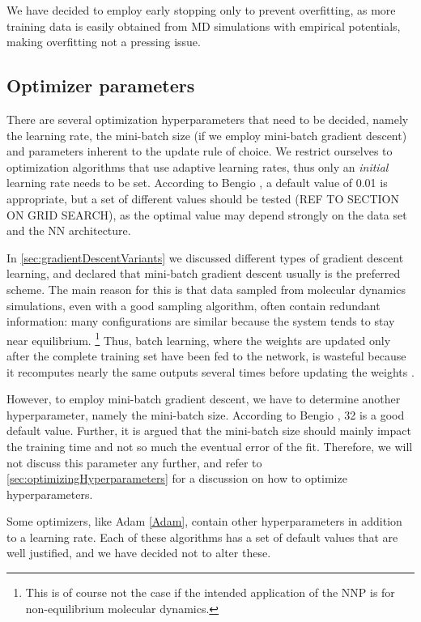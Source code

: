 \documentclass[twoside,english]{uiofysmaster}
\begin{document}
We have decided to employ early stopping only to prevent overfitting, as more training data is easily obtained from MD 
simulations with empirical potentials, making overfitting not a pressing issue. 


\subsection{Optimizer parameters}
There are several optimization hyperparameters that need to be decided, namely the learning rate, the mini-batch size
(if we employ mini-batch gradient descent) and parameters inherent to the update rule of choice. 
We restrict ourselves to optimization algorithms that use adaptive learning rates, thus only an \textit{initial}
learning rate needs to be set. According to Bengio \cite{Bengio12}, a default value of 0.01 is appropriate, but 
a set of different values should be tested (REF TO SECTION ON GRID SEARCH), 
as the optimal value may depend strongly on the data set and the NN architecture. 

In \autoref{sec:gradientDescentVariants} we discussed different types of gradient descent learning, and 
declared that mini-batch gradient descent usually is the preferred scheme. The main reason for this is that data sampled from molecular 
dynamics simulations, even with a good sampling algorithm, often contain redundant information: many configurations 
are similar because the system tends to stay near equilibrium. \footnote{This is of course not the case if the intended
application of the NNP is for non-equilibrium molecular dynamics.} Thus, batch learning, where the weights are updated 
only after the complete training set have been fed to the network, is wasteful because it recomputes nearly the same outputs
several times before updating the weights \cite{LeCun99}. 

However, to employ mini-batch gradient descent, we have to determine another 
hyperparameter, namely the mini-batch size. According to Bengio \cite{Bengio12}, 32 is a good default value. Further, it is argued 
that the mini-batch size should mainly impact the training time and not so much the eventual error of the fit.
Therefore, we will not discuss this parameter any further, and refer to \autoref{sec:optimizingHyperparameters} for a discussion
on how to optimize hyperparameters.

Some optimizers, like Adam \eqref{Adam}, contain other hyperparameters in addition to a learning rate.  
Each of these algorithms has a set of default values that are well justified, and we have decided not to alter these. 
\end{document}
